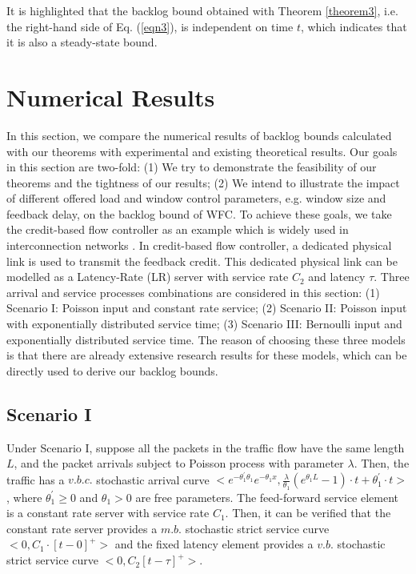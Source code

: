 \documentclass[12pt]{article}
\begin{document}
It is highlighted that the backlog bound obtained with Theorem \ref{theorem3}, i.e. the right-hand side of Eq. (\ref{eqn3}), is
independent on time $t$, which indicates that it is also a steady-state bound.

\section{Numerical Results}\label{experiments}
In this section, we compare the numerical results of backlog bounds calculated with our theorems with experimental and existing theoretical results. Our goals in this section are two-fold: (1) We try to demonstrate the feasibility of our theorems and the tightness of our results; (2) We intend to illustrate the impact of different offered load and window control parameters, e.g. window size and feedback delay, on the backlog bound of WFC. To achieve these goals, we take the credit-based flow controller as an example which is widely used in interconnection networks \cite{DaTo04}. In credit-based flow controller, a dedicated physical link is used to transmit the feedback credit. This dedicated physical link can be modelled as a Latency-Rate (LR) server \cite{StVa98} with service rate $C_2$ and latency $\tau$. Three arrival and service processes combinations are considered in this section: (1) Scenario I: Poisson input and constant rate service; (2) Scenario II: Poisson input with exponentially distributed service time; (3) Scenario III: Bernoulli input and exponentially distributed service time. The reason of choosing these three models is that there are already extensive research results for these models, which can be directly used to derive our backlog bounds.

\subsection{Scenario I}
Under Scenario I, suppose all the packets in the traffic flow have the same length $L$, and the packet arrivals subject to Poisson process with parameter $\lambda$. Then, the traffic has a $v.b.c.$ stochastic arrival curve $<e^{-\theta_1^\prime\theta_1}e^{-\theta_1 x},\frac{\lambda}{\theta_1}(e^{\theta_1 L}-1)\cdot t+\theta_1^\prime\cdot t>$ \cite{jiang2010note}, where $\theta_1^\prime\geq 0$ and $\theta_1>0$ are free parameters. The feed-forward service element is a constant rate server with service rate $C_1$. Then, it can be verified that the constant rate server provides a $m.b.$ stochastic strict service curve $<0,C_1\cdot [t-0]^+>$ and the fixed latency element provides a $v.b.$ stochastic strict service curve $<0,C_2[t-\tau]^+>$.
\end{document}
